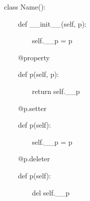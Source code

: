 \begin{frame}
class Name():

~~~~def \_\_init\_\_(self, p):

~~~~~~~~self.\_\_p = p

~~~~@property

~~~~def p(self, p):

~~~~~~~~return self.\_\_p

~~~~@p.setter

~~~~def p(self):

~~~~~~~~self.\_\_p = p

~~~~@p.deleter

~~~~def p(self):

~~~~~~~~del self.\_\_p

\end{frame}
